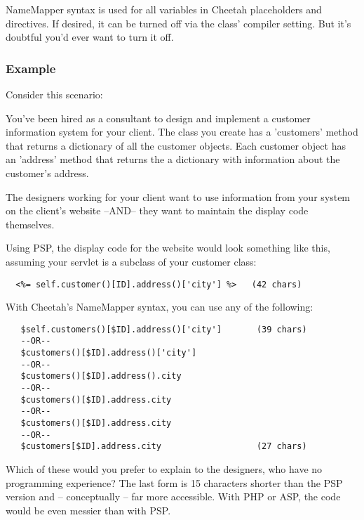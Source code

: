 NameMapper syntax is used for all variables in Cheetah placeholders and
directives. If desired, it can be turned off via the  class'
 compiler setting.  But it's doubtful you'd ever want to
turn it off.

\subsubsection{Example}
\label{language.namemapper.example}

Consider this scenario:

You've been hired as a consultant to design and implement a customer information
system for your client. The class you create has a 'customers' method that
returns a dictionary of all the customer objects.  Each customer object has an
'address' method that returns the a dictionary with information about the
customer's address.

The designers working for your client want to use information from your system
on the client's website --AND-- they want to maintain the display code
themselves.

Using PSP, the display code for the website would look something like this,
assuming your servlet is a subclass of your customer class:


\begin{verbatim}
  <%= self.customer()[ID].address()['city'] %>   (42 chars)
\end{verbatim}

With Cheetah's NameMapper syntax, you can use any of the following:

\begin{verbatim}
   $self.customers()[$ID].address()['city']       (39 chars)
   --OR--                                         
   $customers()[$ID].address()['city']           
   --OR--                                         
   $customers()[$ID].address().city              
   --OR--                                         
   $customers()[$ID].address.city                
   --OR--                                         
   $customers()[$ID].address.city
   --OR--
   $customers[$ID].address.city                   (27 chars)                     
\end{verbatim}   

Which of these would you prefer to explain to the designers, who have no
programming experience?  The last form is 15 characters shorter than the PSP
version and -- conceptually -- far more accessible. With PHP or ASP, the
code would be even messier than with PSP.

